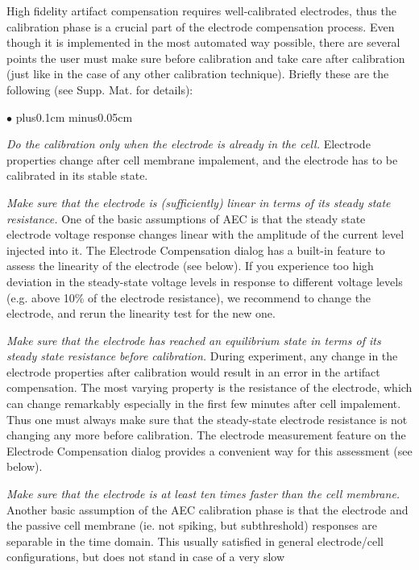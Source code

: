 \documentclass{article}
\newenvironment{myitem}{\begin{list}{$\bullet$}{\setlength{\leftmargin}{1.1em}
\itemsep0.1cm plus0.1cm minus0.05cm
\listparindent0cm
\addtolength{\labelsep}{0.5\labelsep}
\setlength{\labelwidth}{0.8em}
\setlength{\leftmargin}{\labelwidth}
\addtolength{\leftmargin}{\labelsep}
}}{\end{list}}
\begin{document}
High fidelity artifact compensation requires well-calibrated
electrodes, thus the calibration phase is a crucial part of the electrode
compensation process. Even though it is implemented in the most automated
way possible, there are several points the user must make sure before
calibration and take care after calibration (just like in the case of any other
calibration technique). Briefly these are the
following (see \cite{Brette2008} Supp. Mat. for details): 
\begin{myitem}
\item \emph{Do the calibration only when the electrode is already in the
  cell.} Electrode properties change after cell membrane impalement, and
  the electrode has to be calibrated in its stable state.
\item \emph{Make sure that the electrode is (sufficiently) linear in terms
  of its steady state resistance.} One of 
  the basic assumptions of AEC is that the steady state electrode voltage
  response changes linear with the amplitude of the current level injected
  into it. The Electrode Compensation dialog has a built-in feature to
  assess the linearity of the electrode (see below). If you experience too
  high deviation in the steady-state voltage levels in response to
  different voltage levels (e.g. above 10\% of the electrode resistance),
  we recommend to change the electrode, and rerun the linearity test for
  the new one.
\item \emph{Make sure that the electrode has reached an equilibrium state
  in terms of its steady state resistance before calibration.} During
  experiment, any change in the electrode properties after calibration
  would result in an error in the artifact compensation. The most varying
  property is the resistance of the electrode, which can change remarkably
  especially in the first few minutes after cell
  impalement. Thus one must always make sure that the steady-state
  electrode resistance is not changing any more before calibration. The
  electrode measurement feature on the Electrode Compensation dialog
  provides a convenient way for this assessment (see below).  
\item \emph{Make sure that the electrode is at least ten times faster than
  the cell membrane.} Another basic assumption of the AEC calibration phase
  is that the electrode and the passive cell membrane (ie. not spiking, but
  subthreshold) responses are separable in the time domain. This usually satisfied in general
  electrode/cell configurations, but does not stand in case of a very slow

\end{myitem}
\end{document}
